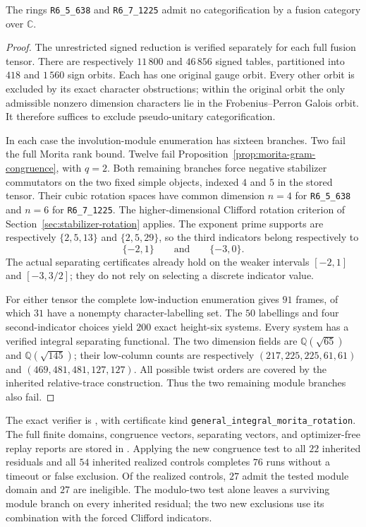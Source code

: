 \begin{proposition}\label{prop:round3-higher-stabilizer}
The rings \texttt{R6\_5\_638} and \texttt{R6\_7\_1225} admit no
categorification by a fusion category over $\mathbb C$.
\end{proposition}
\begin{proof}
The unrestricted signed reduction is verified separately for each full
fusion tensor. There are respectively $11\,800$ and $46\,856$ signed
tables, partitioned into $418$ and $1\,560$ sign orbits. Each has one
original gauge orbit. Every other orbit is excluded by its exact
character obstructions; within the original orbit the only admissible
nonzero dimension characters lie in the Frobenius--Perron Galois orbit.
It therefore suffices to exclude pseudo-unitary categorification.

In each case the involution-module enumeration has sixteen branches.
Two fail the full Morita rank bound. Twelve fail
Proposition~\ref{prop:morita-gram-congruence}, with $q=2$. Both remaining
branches force negative stabilizer commutators on the two fixed simple
objects, indexed $4$ and $5$ in the stored tensor. Their cubic rotation
spaces have common dimension $n=4$ for \texttt{R6\_5\_638} and $n=6$
for \texttt{R6\_7\_1225}. The higher-dimensional Clifford rotation
criterion of Section~\ref{sec:stabilizer-rotation} applies. The exponent
prime supports are respectively $\{2,5,13\}$ and $\{2,5,29\}$, so the
third indicators belong respectively to
\[
 \{-2,1\}\qquad\text{and}\qquad\{-3,0\}.
\]
The actual separating certificates already hold on the weaker intervals
$[-2,1]$ and $[-3,3/2]$; they do not rely on selecting a discrete indicator
value.

For either tensor the complete low-induction enumeration gives $91$
frames, of which $31$ have a nonempty character-labelling set. The $50$
labellings and four second-indicator choices yield $200$ exact
height-six systems. Every system has a verified integral separating
functional. The two dimension fields are $\mathbb Q(\sqrt{65})$ and
$\mathbb Q(\sqrt{145})$; their low-column counts are respectively
$(217,225,225,61,61)$ and $(469,481,481,127,127)$. All possible twist
orders are covered by the inherited relative-trace construction.
Thus the two remaining module branches also fail.
\end{proof}

The exact verifier is
, with certificate kind
\texttt{general\_integral\_morita\_rotation}. The full finite domains,
congruence vectors, separating vectors, and optimizer-free replay reports
are stored in . Applying the new
congruence test to all $22$ inherited residuals and all $54$ inherited
realized controls completes $76$ runs without a timeout or false
exclusion. Of the realized controls, $27$ admit the tested module domain
and $27$ are ineligible. The modulo-two test alone leaves a surviving
module branch on every inherited residual; the two new exclusions use
its combination with the forced Clifford indicators.
